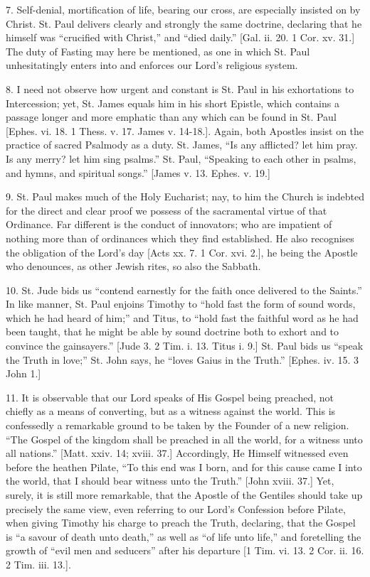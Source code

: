 7. Self-denial, mortification of life, bearing our cross, are
especially insisted on by Christ. St. Paul delivers clearly and strongly
the same doctrine, declaring that he himself was ``crucified with
Christ,'' and ``died daily.'' [Gal. ii. 20. 1 Cor. xv. 31.]
The duty of Fasting may here be mentioned, as one in which St. Paul
unhesitatingly enters into and enforces our Lord's religious system.

8. I need not observe how urgent and constant is St. Paul in his
exhortations to Intercession; yet, St. James equals him in his short
Epistle, which contains a passage longer and more emphatic than any
which can be found in St. Paul [Ephes. vi. 18. 1 Thess. v. 17. James v.
14-18.]. Again, both Apostles insist on the practice of sacred Psalmody
as a duty. St. James, ``Is any afflicted? let him pray. Is any
merry? let him sing psalms.'' St. Paul, ``Speaking to each other
in psalms, and hymns, and spiritual songs.'' [James v. 13. Ephes. v.
19.]

9. St. Paul makes much of the Holy Eucharist; nay, to him the Church
is indebted for the direct and clear proof we possess of the sacramental
virtue of that Ordinance. Far different is the conduct of innovators;
who are impatient of nothing more than of ordinances which they find
established. He also recognises the obligation of the Lord's day [Acts
xx. 7. 1 Cor. xvi. 2.], he being the Apostle who denounces, as other
Jewish rites, so also the Sabbath.

10. St. Jude bids us ``contend earnestly for the faith once
delivered to the Saints.'' In like manner, St. Paul enjoins Timothy
to ``hold fast the form of sound words, which he had heard of
him;'' and Titus, to ``hold fast the faithful word as he had
been taught, that he might be able by sound doctrine both to exhort and
to convince the gainsayers.'' [Jude 3. 2 Tim. i. 13. Titus i. 9.]
St. Paul bids us ``speak the Truth in love;'' St. John says, he
``loves Gaius in the Truth.'' [Ephes. iv. 15. 3 John 1.]

11. It is observable that our Lord speaks of His Gospel being
preached, not chiefly as a means of converting, but as a witness against
the world. This is confessedly a remarkable ground to be taken by the
Founder of a new religion. ``The Gospel of the kingdom shall be
preached in all the world, for a witness unto all nations.'' [Matt.
xxiv. 14; xviii. 37.] Accordingly, He Himself witnessed even before the
heathen Pilate, ``To this end was I born, and for this cause came I
into the world, that I should bear witness unto the Truth.'' [John
xviii. 37.] Yet, surely, it is still more remarkable, that the Apostle
of the Gentiles should take up precisely the same view, even referring
to our Lord's Confession before Pilate, when giving Timothy his charge
to preach the Truth, declaring, that the Gospel is ``a savour of
death unto death,'' as well as ``of life unto life,'' and
foretelling the growth of ``evil men and seducers'' after his
departure [1 Tim. vi. 13. 2 Cor. ii. 16. 2 Tim. iii. 13.].

